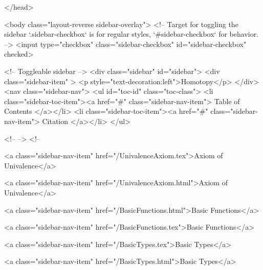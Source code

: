   
</head>




  <body class="layout-reverse sidebar-overlay">
    <!-- Target for toggling the sidebar `.sidebar-checkbox` is for regular
     styles, `#sidebar-checkbox` for behavior. -->
<input type="checkbox" class="sidebar-checkbox" id="sidebar-checkbox" checked>

<!-- Toggleable sidebar -->
<div class="sidebar" id="sidebar">
  <div class="sidebar-item" >
    <p style="text-decoration:left">Homotopy</p>
  </div>
  <nav class="sidebar-nav">
    <ul id="toc-id" class="toc-class">
  <li class="sidebar-toc-item"><a href="#" class="sidebar-nav-item"> Table of Contents </a></li>
  <li class="sidebar-toc-item"><a href="#" class="sidebar-nav-item"> Citation </a></li>
</ul>


    <!--  -->
    <!-- 
      
    
      
    
      
    
      
    
      
        
      
    
      
        
          <a class="sidebar-nav-item" href="/UnivalenceAxiom.tex">Axiom of Univalence</a>
        
      
    
      
        
          <a class="sidebar-nav-item" href="/UnivalenceAxiom.html">Axiom of Univalence</a>
        
      
    
      
        
          <a class="sidebar-nav-item" href="/BasicFunctions.html">Basic Functions</a>
        
      
    
      
        
          <a class="sidebar-nav-item" href="/BasicFunctions.tex">Basic Functions</a>
        
      
    
      
        
          <a class="sidebar-nav-item" href="/BasicTypes.tex">Basic Types</a>
        
      
    
      
        
          <a class="sidebar-nav-item" href="/BasicTypes.html">Basic Types</a>
        
      
    

